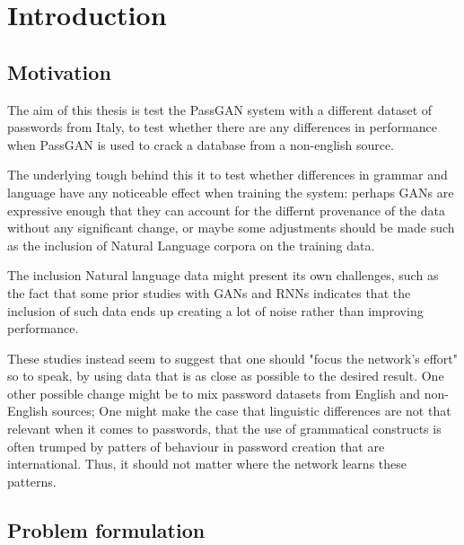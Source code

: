\section{Introduction}
\subsection{Motivation}
The aim of this thesis is test the PassGAN system with a different dataset of passwords from Italy, to test whether there are any differences in performance when PassGAN is used to crack a database from a non-english source.

The underlying tough behind this it to test whether differences in grammar and language have any noticeable effect when training the system: perhaps GANs are expressive enough that they 
can account for the differnt provenance of the data without any significant change, or maybe some adjustments should be made such as the inclusion of Natural Language corpora on the training data.

The inclusion Natural language data might present its own challenges, such as the fact that some prior studies with GANs and RNNs indicates that the inclusion of such data ends up creating a lot of noise rather than improving performance\cite{PassGAN, Melicher2016}. 

These studies instead seem to suggest that one should "focus the network's effort" so to speak, by using data that is as close as possible to the desired result.
One other possible change might be to mix password datasets from English and non-English sources; One might make the case that linguistic differences are not that relevant when it comes to passwords, that the use of grammatical constructs is often trumped by patters of behaviour in password creation that are international. Thus, it should not matter where the network learns these patterns.


\subsection{Problem formulation}
